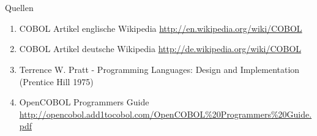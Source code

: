 \documentclass[handout]{beamer}
\begin{document}
\section{}%
\begin{frame}{Quellen}
	\begin{enumerate}
		\item COBOL Artikel englische Wikipedia
			\url{http://en.wikipedia.org/wiki/COBOL}
		\item COBOL Artikel deutsche Wikipedia
			\url{http://de.wikipedia.org/wiki/COBOL}
		\item
			Terrence W. Pratt - Programming Languages: Design and Implementation (Prentice Hill 1975)
		\item OpenCOBOL Programmers Guide \url{http://opencobol.add1tocobol.com/OpenCOBOL\%20Programmers\%20Guide.pdf}
	\end{enumerate}
\end{frame}
\end{document}
